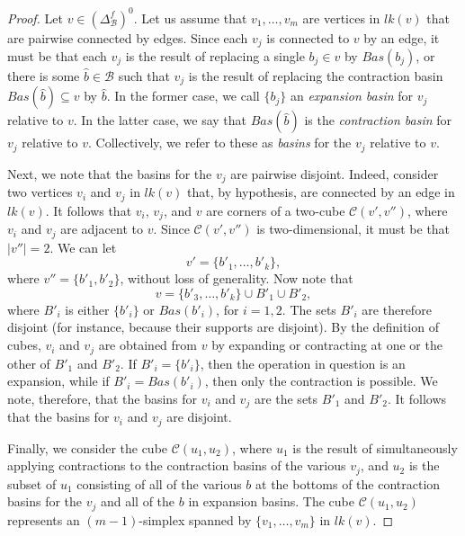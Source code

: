 \documentclass{amsart}
\newtheorem{standing assumption}[theorem]{Standing Assumption}
\begin{document}
\begin{proof}
Let $v \in \left(\Delta^{f}_{\mathcal{B}}\right)^{0}$. Let us assume that $v_{1}, \ldots, v_{m}$ are vertices in $lk(v)$ that
are pairwise connected by edges. Since each $v_{j}$ is connected to $v$ by an edge, it must be that each $v_{j}$ is the result of replacing a single $b_{j} \in v$ by 
$Bas(b_{j})$, or there is some $\hat{b} \in \mathcal{B}$ such that $v_{j}$ is the result of replacing the contraction basin $Bas(\hat{b}) \subseteq v$ by 
$\hat{b}$. In the former case, we call $\{ b_{j} \}$ an \emph{expansion basin} for $v_{j}$ relative to $v$. In the latter case, we say that $Bas(\hat{b})$ is the \emph{contraction basin} for
$v_{j}$ relative to $v$. Collectively, we refer to these as \emph{basins} for the $v_{j}$ relative to $v$. 

Next, we note that the basins for the $v_{j}$ are pairwise disjoint.
Indeed, consider two vertices $v_{i}$ and $v_{j}$ in $lk(v)$ that, by hypothesis, are connected by an edge in $lk(v)$. It follows that $v_{i}$, $v_{j}$, and $v$ are corners of a two-cube $\mathcal{C}(v',v'')$, where $v_{i}$ and $v_{j}$ are adjacent to $v$. 
Since $\mathcal{C}(v',v'')$ is two-dimensional, it must be that  $|v''| = 2$. We can let
\[ v' = \{ b'_{1}, \ldots, b'_{k} \}, \]
where $v'' = \{ b'_{1}, b'_{2} \}$, without loss of generality. Now note that 
\[ v = \{ b'_{3}, \ldots, b'_{k} \} \cup B'_{1} \cup B'_{2}, \]
where $B'_{i}$ is either $\{ b'_{i} \}$ or $Bas(b'_{i})$, for $i=1,2$. The sets $B'_{i}$ are therefore disjoint (for instance, because their supports are disjoint). By the definition of cubes, $v_{i}$ and $v_{j}$ are obtained from $v$ by expanding or contracting at one or the other of $B'_{1}$ and $B'_{2}$. If $B'_{i} = \{ b'_{i} \}$, then the operation in question is an expansion, while if
$B'_{i} = Bas(b'_{i})$, then only the contraction is possible. We note, therefore, that the basins for $v_{i}$ and $v_{j}$ are the sets $B'_{1}$ and $B'_{2}$. It follows that the basins for $v_{i}$ and $v_{j}$ are disjoint.

Finally, we consider the cube $\mathcal{C}(u_{1},u_{2})$, where $u_{1}$ is the result of simultaneously applying contractions to the contraction basins of the various $v_{j}$,
and $u_{2}$ is the subset of $u_{1}$ consisting of all of the various $b$ at the bottoms of the contraction basins for the $v_{j}$ and all of the $b$ in expansion basins. The cube
$\mathcal{C}(u_{1},u_{2})$ represents an $(m-1)$-simplex spanned by 
$\{ v_{1}, \ldots, v_{m} \}$ in $lk(v)$.
\end{proof}
\end{document}
